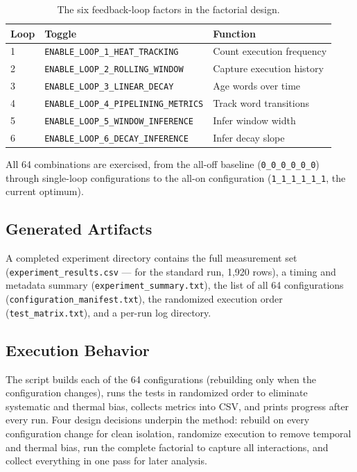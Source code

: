 \begin{table}[h]
\centering
\begin{tabular}{lll}
\toprule
Loop & Toggle & Function \\
\midrule
1 & \texttt{ENABLE\_LOOP\_1\_HEAT\_TRACKING} & Count execution frequency \\
2 & \texttt{ENABLE\_LOOP\_2\_ROLLING\_WINDOW} & Capture execution history \\
3 & \texttt{ENABLE\_LOOP\_3\_LINEAR\_DECAY} & Age words over time \\
4 & \texttt{ENABLE\_LOOP\_4\_PIPELINING\_METRICS} & Track word transitions \\
5 & \texttt{ENABLE\_LOOP\_5\_WINDOW\_INFERENCE} & Infer window width \\
6 & \texttt{ENABLE\_LOOP\_6\_DECAY\_INFERENCE} & Infer decay slope \\
\bottomrule
\end{tabular}
\caption{The six feedback-loop factors in the factorial design.}
\end{table}

All 64 combinations are exercised, from the all-off baseline
(\texttt{0\_0\_0\_0\_0\_0}) through single-loop configurations to the all-on
configuration (\texttt{1\_1\_1\_1\_1\_1}, the current optimum).

\subsection{Generated Artifacts}

A completed experiment directory contains the full measurement set
(\texttt{experiment\_results.csv} --- for the standard run, 1{,}920 rows), a
timing and metadata summary (\texttt{experiment\_summary.txt}), the list of all
64 configurations (\texttt{configuration\_manifest.txt}), the randomized
execution order (\texttt{test\_matrix.txt}), and a per-run log directory.

\subsection{Execution Behavior}

The script builds each of the 64 configurations (rebuilding only when the
configuration changes), runs the tests in randomized order to eliminate
systematic and thermal bias, collects metrics into CSV, and prints progress
after every run. Four design decisions underpin the method: rebuild on every
configuration change for clean isolation, randomize execution to remove
temporal and thermal bias, run the complete factorial to capture all
interactions, and collect everything in one pass for later analysis.

